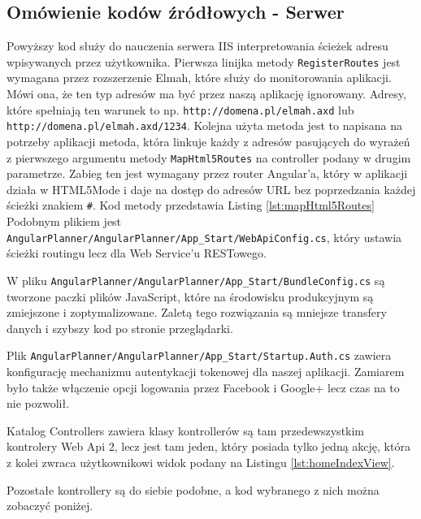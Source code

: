 \documentclass[10pt,titlepage]{article}
\begin{document}
\subsection{Omówienie kodów źródłowych - Serwer}
\lstset{style=sharpc}

\par Powyższy kod służy do nauczenia serwera IIS interpretowania ścieżek adresu wpisywanych przez użytkownika. Pierwsza linijka metody \verb|RegisterRoutes| jest wymagana przez rozszerzenie Elmah, które służy do monitorowania aplikacji. Mówi ona, że ten typ adresów ma być przez naszą aplikację ignorowany. Adresy, które spełniają ten warunek to np. \verb|http://domena.pl/elmah.axd| lub \verb|http://domena.pl/elmah.axd/1234|. Kolejna użyta metoda jest to napisana na potrzeby aplikacji metoda, która linkuje każdy z adresów pasujących do wyrażeń z pierwszego argumentu metody \verb|MapHtml5Routes| na controller podany w drugim parametrze. Zabieg ten jest wymagany przez router Angular'a, który w aplikacji działa w HTML5Mode i daje na dostęp do adresów URL bez poprzedzania każdej ścieżki znakiem \verb|#|. Kod metody przedstawia Listing \ref{lst:mapHtml5Routes} Podobnym plikiem jest \verb|AngularPlanner/AngularPlanner/App_Start/WebApiConfig.cs|, który ustawia ścieżki routingu lecz dla Web Service'u RESTowego.

\par W pliku \verb|AngularPlanner/AngularPlanner/App_Start/BundleConfig.cs| są tworzone paczki plików JavaScript, które na środowisku produkcyjnym są zmiejszone i zoptymalizowane. Zaletą tego rozwiązania są mniejsze transfery danych i szybszy kod po stronie przeglądarki.\par Plik \verb|AngularPlanner/AngularPlanner/App_Start/Startup.Auth.cs| zawiera konfigurację mechanizmu autentykacji tokenowej dla naszej aplikacji. Zamiarem było także włączenie opcji logowania przez Facebook i Google+ lecz czas na to nie pozwolił.\par Katalog Controllers zawiera klasy kontrollerów są tam przedewszystkim kontrolery Web Api 2, lecz jest tam jeden, który posiada tylko jedną akcję, która z kolei zwraca użytkownikowi widok podany na Listingu \ref{lst:homeIndexView}.

\par Pozostałe kontrollery są do siebie podobne, a kod wybranego z nich można zobaczyć poniżej.
\end{document}
